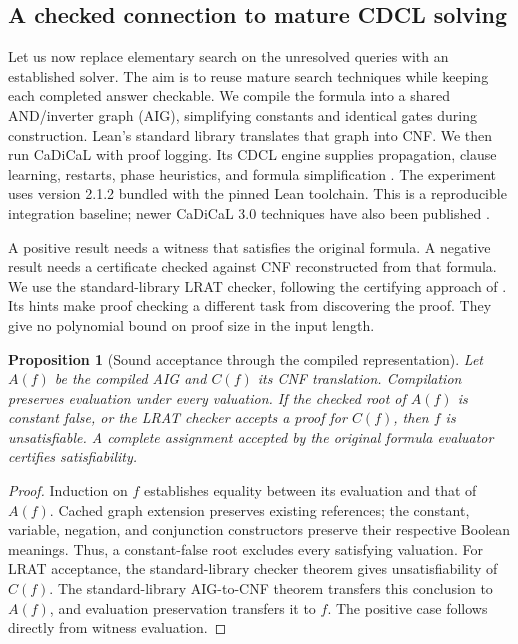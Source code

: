 \documentclass[11pt,a4paper]{article}
\numberwithin{equation}{section}
\theoremstyle{plain}
\newtheorem{proposition}[lemma]{Proposition}
\theoremstyle{definition}
\theoremstyle{remark}
\begin{document}
\subsection{A checked connection to mature CDCL solving}
\label{sec:checked-cdcl}

Let us now replace elementary search on the unresolved queries with an established solver. The aim is to reuse mature search techniques while keeping each completed answer checkable. We compile the formula into a shared AND/inverter graph (AIG), simplifying constants and identical gates during construction. Lean's standard library translates that graph into CNF. We then run CaDiCaL with proof logging. Its CDCL engine supplies propagation, clause learning, restarts, phase heuristics, and formula simplification \citep{biere2024cadical}. The experiment uses version 2.1.2 bundled with the pinned Lean toolchain. This is a reproducible integration baseline; newer CaDiCaL 3.0 techniques have also been published \citep{pollitt2026cadical}.

A positive result needs a witness that satisfies the original formula. A negative result needs a certificate checked against CNF reconstructed from that formula. We use the standard-library LRAT checker, following the certifying approach of \citet{cruzfilipe2017lrat}. Its hints make proof checking a different task from discovering the proof. They give no polynomial bound on proof size in the input length.

\begin{samepage}
\begin{proposition}[Sound acceptance through the compiled representation]
\label{prop:cdcl-boundary}
Let $A(f)$ be the compiled AIG and $C(f)$ its CNF translation. Compilation preserves evaluation under every valuation. If the checked root of $A(f)$ is constant false, or the LRAT checker accepts a proof for $C(f)$, then $f$ is unsatisfiable. A complete assignment accepted by the original formula evaluator certifies satisfiability.
\end{proposition}
\end{samepage}

\begin{proof}
Induction on $f$ establishes equality between its evaluation and that of $A(f)$. Cached graph extension preserves existing references; the constant, variable, negation, and conjunction constructors preserve their respective Boolean meanings. Thus, a constant-false root excludes every satisfying valuation. For LRAT acceptance, the standard-library checker theorem gives unsatisfiability of $C(f)$. The standard-library AIG-to-CNF theorem transfers this conclusion to $A(f)$, and evaluation preservation transfers it to $f$. The positive case follows directly from witness evaluation.
\end{proof}
\end{document}
